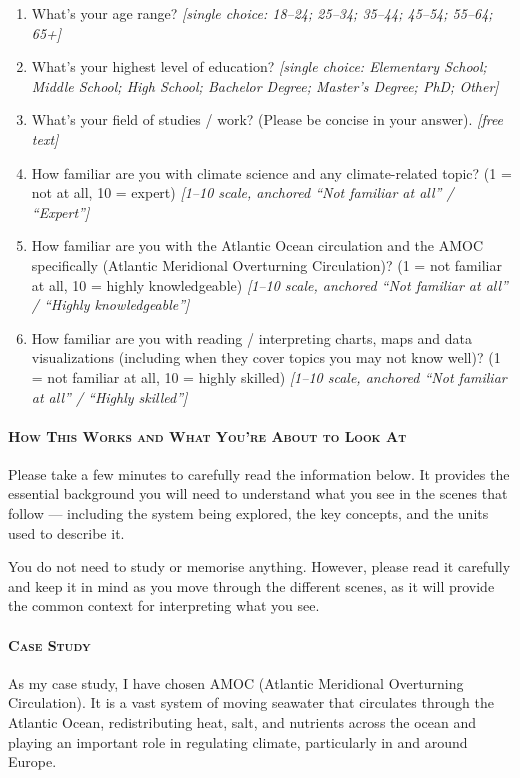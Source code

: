 \begin{enumerate}[leftmargin=2em, itemsep=3pt]
\item What's your age range? \emph{[single choice: 18--24; 25--34; 35--44; 45--54; 55--64;
      65+]}
\item What's your highest level of education? \emph{[single choice: Elementary School; Middle
      School; High School; Bachelor Degree; Master's Degree; PhD; Other]}
\item What's your field of studies / work? (Please be concise in your answer).
      \emph{[free text]}
\item How familiar are you with climate science and any climate-related topic?
      (1 = not at all, 10 = expert) \emph{[1--10 scale, anchored ``Not familiar at all'' /
      ``Expert'']}
\item How familiar are you with the Atlantic Ocean circulation and the AMOC specifically
      (Atlantic Meridional Overturning Circulation)? (1 = not familiar at all, 10 = highly
      knowledgeable) \emph{[1--10 scale, anchored ``Not familiar at all'' / ``Highly
      knowledgeable'']}
\item How familiar are you with reading / interpreting charts, maps and data visualizations
      (including when they cover topics you may not know well)? (1 = not familiar at all,
      10 = highly skilled) \emph{[1--10 scale, anchored ``Not familiar at all'' / ``Highly
      skilled'']}
\end{enumerate}

\paragraph{\textsc{How This Works and What You're About to Look At}}
Please take a few minutes to carefully read the information below. It provides the essential
background you will need to understand what you see in the scenes that follow --- including
the system being explored, the key concepts, and the units used to describe it.

You do not need to study or memorise anything. However, please read it carefully and keep it
in mind as you move through the different scenes, as it will provide the common context for
interpreting what you see.

\paragraph{\textsc{Case Study}}
As my case study, I have chosen AMOC (Atlantic Meridional Overturning Circulation). It is a
vast system of moving seawater that circulates through the Atlantic Ocean, redistributing
heat, salt, and nutrients across the ocean and playing an important role in regulating
climate, particularly in and around Europe.

